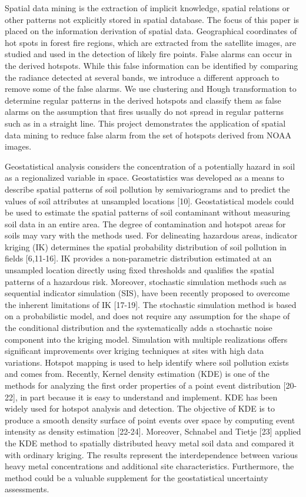 \documentclass[12pt]{report}	%
\begin{document}
Spatial data mining is the extraction of implicit
knowledge, spatial relations or other patterns not
explicitly stored in spatial database. The focus of this
paper is placed on the information derivation of spatial
data. Geographical coordinates of hot spots in forest fire
regions, which are extracted from the satellite images, are
studied and used in the detection of likely fire points.
False alarms can occur in the derived hotspots. While this
false information can be identified by comparing the
radiance detected at several bands, we introduce a
different approach to remove some of the false alarms.
We use clustering and Hough transformation to determine
regular patterns in the derived hotspots and classify them
as false alarms on the assumption that fires usually do not
spread in regular patterns such as in a straight line. This
project demonstrates the application of spatial data
mining to reduce false alarm from the set of hotspots
derived from NOAA images.

Geostatistical analysis considers the concentration of a potentially hazard in soil as a regionalized variable in space. Geostatistics was developed as a means to describe spatial patterns of soil pollution by semivariograms and to predict the values of soil attributes at unsampled locations [10]. Geostatistical models could be used to estimate the spatial patterns of soil contaminant without measuring soil data in an entire area. The degree of contamination and hotspot areas for soils may vary with the methods used. For delineating hazardous areas, indicator kriging (IK) determines the spatial probability distribution of soil pollution in fields [6,11-16]. IK provides a non-parametric distribution estimated at an unsampled location directly using fixed thresholds and qualifies the spatial patterns of a hazardous risk. Moreover, stochastic simulation methods such as sequential indicator simulation (SIS), have been recently proposed to overcome the inherent limitations of IK [17-19]. The stochastic simulation method is based on a probabilistic model, and does not require any assumption for the shape of the conditional distribution and the systematically adds a stochastic noise component into the kriging model. Simulation with multiple realizations offers significant improvements over kriging techniques at sites with high data variations.
Hotspot mapping is used to help identify where soil pollution exists and comes from. Recently, Kernel density estimation (KDE) is one of the methods for analyzing the first order properties of a point event distribution [20-22], in part because it is easy to understand and implement. KDE has been widely used for hotspot analysis and detection. The objective of KDE is to produce a smooth density surface of point events over space by computing event intensity as density estimation [22-24]. Moreover, Schnabel and Tietje [23] applied the KDE method to spatially distributed heavy metal soil data and compared it with ordinary kriging. The results represent the interdependence between various heavy metal concentrations and additional site characteristics. Furthermore, the method could be a valuable supplement for the geostatistical uncertainty assessments.
\end{document}
